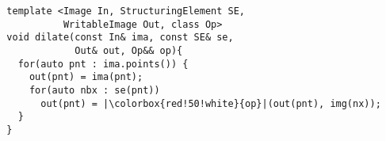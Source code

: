 \documentclass[varwidth=8cm, border={0.1cm 0.1cm 0.1cm 0.1cm}]{standalone}
\begin{document}
\begin{verbatim}
  template <Image In, StructuringElement SE,
            WritableImage Out, class Op>
  void dilate(const In& ima, const SE& se,
              Out& out, Op&& op){
    for(auto pnt : ima.points()) {
      out(pnt) = ima(pnt);
      for(auto nbx : se(pnt))
        out(pnt) = |\colorbox{red!50!white}{op}|(out(pnt), img(nx));
    }
  }
\end{verbatim}
\end{document}
